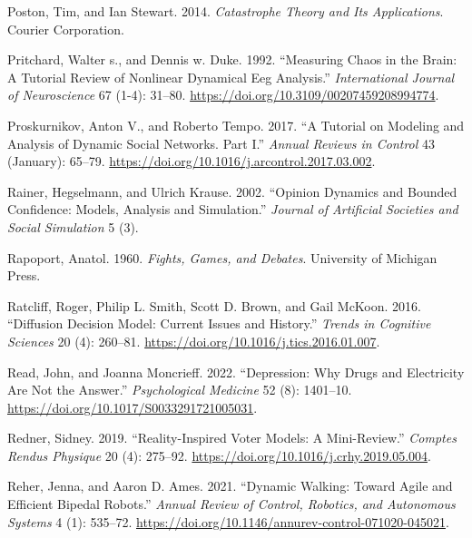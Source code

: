 \documentclass[
  a4paper,
  DIV=11,
  numbers=noendperiod,
  oneside]{scrreprt}
\newlength{\cslhangindent}
\newenvironment{CSLReferences}[2] %
 {\begin{list}{}{%
  \setlength{\itemindent}{0pt}
  \setlength{\leftmargin}{0pt}
  \setlength{\parsep}{0pt}
  \ifodd #1
   \setlength{\leftmargin}{\cslhangindent}
   \setlength{\itemindent}{-1\cslhangindent}
  \fi
  \setlength{\itemsep}{#2\baselineskip}}}
 {\end{list}}
\begin{document}
\begin{CSLReferences}{1}{0}
Poston, Tim, and Ian Stewart. 2014. \emph{Catastrophe {Theory} and {Its
Applications}}. {Courier Corporation}.

Pritchard, Walter s., and Dennis w. Duke. 1992. {``Measuring {Chaos} in
the {Brain}: {A Tutorial Review} of {Nonlinear Dynamical Eeg
Analysis}.''} \emph{International Journal of Neuroscience} 67 (1-4):
31--80. \url{https://doi.org/10.3109/00207459208994774}.

Proskurnikov, Anton V., and Roberto Tempo. 2017. {``A Tutorial on
Modeling and Analysis of Dynamic Social Networks. {Part I}.''}
\emph{Annual Reviews in Control} 43 (January): 65--79.
\url{https://doi.org/10.1016/j.arcontrol.2017.03.002}.

Rainer, Hegselmann, and Ulrich Krause. 2002. {``Opinion {Dynamics} and
{Bounded Confidence}: {Models}, {Analysis} and {Simulation}.''}
\emph{Journal of Artificial Societies and Social Simulation} 5 (3).

Rapoport, Anatol. 1960. \emph{Fights, {Games}, and {Debates}}.
{University of Michigan Press}.

Ratcliff, Roger, Philip L. Smith, Scott D. Brown, and Gail McKoon. 2016.
{``Diffusion {Decision Model}: {Current Issues} and {History}.''}
\emph{Trends in Cognitive Sciences} 20 (4): 260--81.
\url{https://doi.org/10.1016/j.tics.2016.01.007}.

Read, John, and Joanna Moncrieff. 2022. {``Depression: Why Drugs and
Electricity Are Not the Answer.''} \emph{Psychological Medicine} 52 (8):
1401--10. \url{https://doi.org/10.1017/S0033291721005031}.

Redner, Sidney. 2019. {``Reality-Inspired Voter Models: {A}
Mini-Review.''} \emph{Comptes Rendus Physique} 20 (4): 275--92.
\url{https://doi.org/10.1016/j.crhy.2019.05.004}.

Reher, Jenna, and Aaron D. Ames. 2021. {``Dynamic {Walking}: {Toward
Agile} and {Efficient Bipedal Robots}.''} \emph{Annual Review of
Control, Robotics, and Autonomous Systems} 4 (1): 535--72.
\url{https://doi.org/10.1146/annurev-control-071020-045021}.


\end{CSLReferences}
\end{document}
